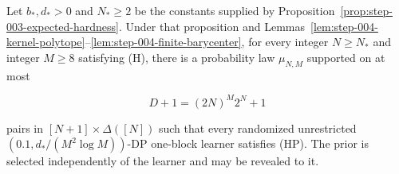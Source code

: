 \begin{proposition}\label{prop:step-004-finite-hard-prior}
Let \(b_*,d_*>0\) and \(N_*\ge2\) be the constants supplied by Proposition~\ref{prop:step-003-expected-hardness}. Under that proposition and
Lemmas~\ref{lem:step-004-kernel-polytope}--\ref{lem:step-004-finite-barycenter},
for every integer \(N\ge N_*\) and integer \(M\ge8\) satisfying (H), there
is a probability law \(\mu_{N,M}\) supported on at most

\[
D+1=(2N)^M2^N+1
\tag{25}
\]

pairs in \([N+1]\times\Delta([N])\) such that every randomized unrestricted
\((0.1,d_*/(M^2\log M))\)-DP one-block learner satisfies (HP). The prior is
selected independently of the learner and may be revealed to it.
\end{proposition}

